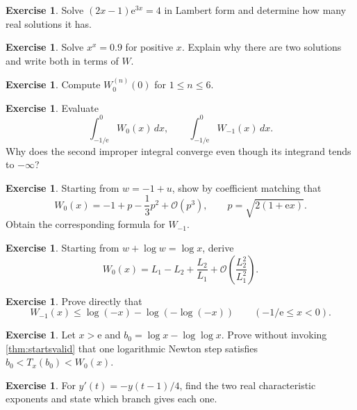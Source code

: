 \documentclass[11pt,oneside]{book}
\theoremstyle{definition}
\newtheorem{exercise}[theorem]{Exercise}
\theoremstyle{remark}
\newcommand{\ee}{\mathrm e}
\newcommand{\bigO}{\mathcal O}
\begin{document}
\begin{exercise}\label{ex:affine}
Solve $(2x-1)\ee^{3x}=4$ in Lambert form and determine how many real
solutions it has.
\end{exercise}

\begin{exercise}\label{ex:xx09}
Solve $x^x=0.9$ for positive $x$.  Explain why there are two solutions and
write both in terms of $W$.
\end{exercise}

\begin{exercise}\label{ex:derivatives}
Compute $W_0^{(n)}(0)$ for $1\le n\le6$.
\end{exercise}

\begin{exercise}\label{ex:integrals}
Evaluate
\[
 \int_{-1/\ee}^{0}W_0(x)\,dx,
 \qquad
 \int_{-1/\ee}^{0}W_{-1}(x)\,dx.
\]
Why does the second improper integral converge even though its integrand
tends to $-\infty$?
\end{exercise}

\begin{exercise}\label{ex:puiseuxfirst}
Starting from $w=-1+u$, show by coefficient matching that
\[
 W_0(x)=-1+p-\frac13p^2+\bigO(p^3),
 \qquad
 p=\sqrt{2(1+\ee x)}.
\]
Obtain the corresponding formula for $W_{-1}$.
\end{exercise}

\begin{exercise}\label{ex:asymptoticfirst}
Starting from $w+\log w=\log x$, derive
\[
 W_0(x)=L_1-L_2+\frac{L_2}{L_1}
 +\bigO\!\left(\frac{L_2^2}{L_1^2}\right).
\]
\end{exercise}

\begin{exercise}\label{ex:wm1bound}
Prove directly that
\[
 W_{-1}(x)\le\log(-x)-\log(-\log(-x))
 \qquad(-1/\ee\le x<0).
\]
\end{exercise}

\begin{exercise}\label{ex:iteration}
Let $x>\ee$ and $b_0=\log x-\log\log x$.  Prove without invoking
\cref{thm:startsvalid} that one logarithmic Newton step satisfies
$b_0<T_x(b_0)<W_0(x)$.
\end{exercise}

\begin{exercise}\label{ex:delay}
For $y'(t)=-y(t-1)/4$, find the two real characteristic exponents and state
which branch gives each one.
\end{exercise}
\end{document}
